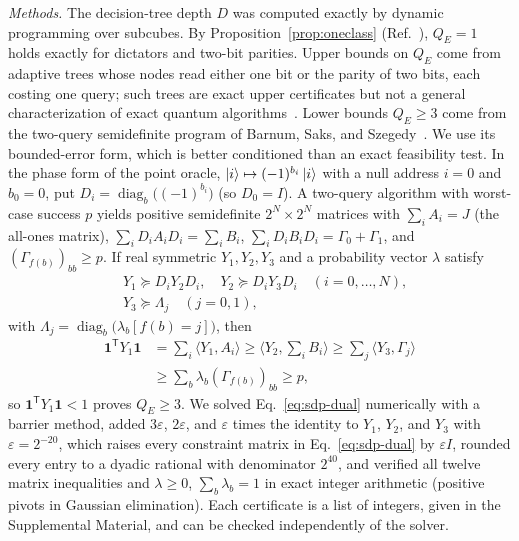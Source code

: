 \documentclass[
  aps,
  pra,
  reprint,
  nofootinbib
]{revtex4-2}
\begin{document}
\emph{Methods.} The decision-tree depth \(D\) was computed exactly by dynamic
programming over subcubes. By Proposition~\ref{prop:oneclass}
(Ref.~\cite{ChenYeLi2020}), \(Q_E=1\) holds exactly for dictators and two-bit
parities. Upper bounds on \(Q_E\) come from adaptive trees whose nodes read
either one bit or the parity of two bits, each costing one query; such trees
are exact upper certificates but not a general characterization of exact
quantum algorithms~\cite{MontanaroJozsaMitchison2015}. Lower bounds
\(Q_E\ge3\) come from the two-query semidefinite program of Barnum, Saks, and
Szegedy~\cite{BarnumSaksSzegedy2003}. We use its bounded-error form, which is
better conditioned than an exact feasibility test. In the phase form of the
point oracle, \(\ket i\mapsto(-1)^{b_i}\ket i\) with a null address \(i=0\) and
\(b_0=0\), put \(D_i=\operatorname{diag}_b\bigl((-1)^{b_i}\bigr)\) (so
\(D_0=I\)). A two-query algorithm with worst-case success \(p\) yields
positive semidefinite \(2^N\times2^N\) matrices with
\(\sum_iA_i=J\) (the all-ones matrix), \(\sum_iD_iA_iD_i=\sum_iB_i\),
\(\sum_iD_iB_iD_i=\Gamma_0+\Gamma_1\), and \((\Gamma_{f(b)})_{bb}\ge p\). If
real symmetric \(Y_1,Y_2,Y_3\) and a probability vector \(\lambda\) satisfy
\begin{equation}
\begin{aligned}
 &Y_1\succeq D_iY_2D_i,\quad Y_2\succeq D_iY_3D_i\quad(i=0,\dots,N),\\
 &Y_3\succeq\Lambda_j\quad(j=0,1),
\end{aligned}
 \label{eq:sdp-dual}
\end{equation}
with \(\Lambda_j=\operatorname{diag}_b\bigl(\lambda_b[f(b)=j]\bigr)\), then
\begin{equation}
\begin{aligned}
 \mathbf 1^{\mathsf T}Y_1\mathbf 1&=\textstyle\sum_i\langle Y_1,A_i\rangle
 \ge\langle Y_2,\textstyle\sum_iB_i\rangle
 \ge\textstyle\sum_j\langle Y_3,\Gamma_j\rangle\\
 &\ge\textstyle\sum_b\lambda_b(\Gamma_{f(b)})_{bb}\ge p ,
\end{aligned}
 \label{eq:weak-duality}
\end{equation}
so \(\mathbf 1^{\mathsf T}Y_1\mathbf 1<1\) proves \(Q_E\ge3\). We solved
Eq.~\eqref{eq:sdp-dual} numerically with a barrier method, added
\(3\varepsilon\), \(2\varepsilon\), and \(\varepsilon\) times the identity to
\(Y_1\), \(Y_2\), and \(Y_3\) with \(\varepsilon=2^{-20}\), which raises every
constraint matrix in Eq.~\eqref{eq:sdp-dual} by \(\varepsilon I\), rounded
every entry to a dyadic rational with denominator \(2^{40}\), and verified all
twelve matrix inequalities and \(\lambda\ge0\), \(\sum_b\lambda_b=1\) in exact
integer arithmetic (positive pivots in Gaussian
elimination). Each certificate is a list of integers, given in the
Supplemental Material, and can be checked independently of the solver.
\end{document}
